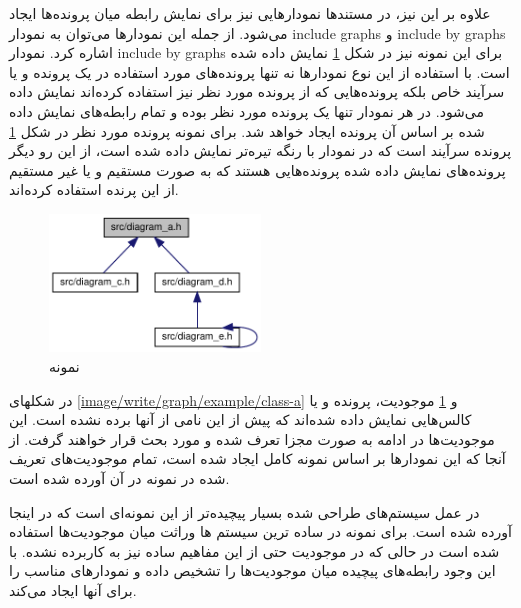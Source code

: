 علاوه بر این نیز، در مستندها نمودارهایی نیز برای نمایش رابطه میان پرونده‌ها
ایجاد می‌شود. از جمله این نمودارها می‌توان به نمودار \glspl{include graph} و
\glspl{include by graph} اشاره کرد. نمودار \glspl{include by graph} برای این
نمونه نیز در شکل \ref{image/write/graph/example/diagram__a_8h__dep__incl} نمایش
داده شده است. با استفاده از این نوع نمودارها نه تنها پرونده‌های مورد استفاده در
یک پرونده و یا سرآیند خاص بلکه پرونده‌هایی که از پرونده مورد نظر نیز استفاده
کرده‌اند نمایش داده می‌شود. در هر نمودار تنها یک پرونده مورد نظر بوده و تمام
رابطه‌های نمایش داده شده بر اساس آن پرونده ایجاد خواهد شد. برای نمونه پرونده
مورد نظر در شکل \ref{image/write/graph/example/diagram__a_8h__dep__incl} پرونده
سرآیند  است که در نمودار با رنگه تیره‌تر نمایش داده شده است، از
این رو دیگر پرونده‌های نمایش داده شده پرونده‌هایی هستند که به صورت مستقیم و یا
غیر مستقیم از این پرنده استفاده کرده‌اند.

\begin{figure}
	\centering
	\includegraphics[width=0.5\textwidth]{image/write/graph/example/diagram__a_8h__dep__incl}
	\caption[نمونه]{
		نمونه
	}
	\label{image/write/graph/example/diagram__a_8h__dep__incl}
\end{figure}

\begin{note}
در شکلهای \ref{image/write/graph/example/class-a} و
\ref{image/write/graph/example/diagram__a_8h__dep__incl}
موجودیت، پرونده و یا کالس‌هایی نمایش داده شده‌اند که پیش از این نامی از آنها
برده نشده است. این موجودیت‌ها در ادامه به صورت مجزا تعرف شده و مورد بحث قرار
خواهند گرفت. از آنجا که این نمودارها بر اساس نمونه کامل ایجاد شده است، تمام
موجودیت‌های تعریف شده در نمونه در آن آورده شده است.
\end{note}

در عمل سیستم‌های طراحی شده بسیار پیچیده‌تر از این نمونه‌ای است که در اینجا آورده
شده است. برای نمونه در ساده ترین سیستم ها وراثت میان موجودیت‌ها استفاده شده است
در حالی که در موجودیت  حتی از این مفاهیم ساده نیز به کاربرده نشده. با این
وجود  رابطه‌های پیچیده میان موجودیت‌ها را تشخیص داده و نمودارهای
مناسب را برای آنها ایجاد می‌کند.

